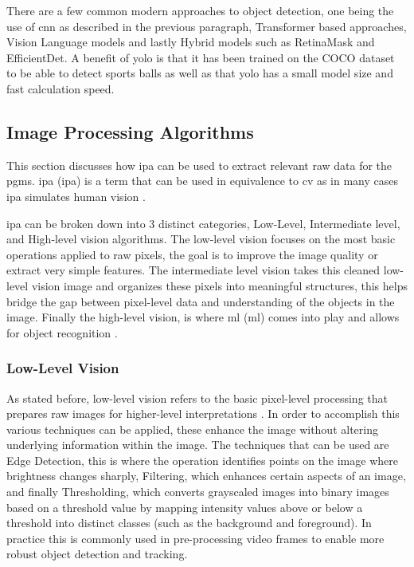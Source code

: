 \documentclass[12pt,a4paper]{article}
\begin{document}
There are a few common modern approaches to object detection, one being the use of \acs{cnn} as described in the previous paragraph, Transformer based approaches, Vision Language models and lastly Hybrid models such as RetinaMask and EfficientDet\parencite{sapkota2025rf}. A benefit of \acs{yolo} is that it has been trained on the COCO dataset to be able to detect sports balls as well as that \acs{yolo} has a small model size and fast calculation speed. 

\subsection{Image Processing Algorithms}
This section discusses how \acs{ipa} can be used to extract relevant raw data for the \acs{pgm}s. \acl{ipa} (\acs{ipa}) is a term that can be used in equivalence to \acs{cv} as in many cases \acs{ipa} simulates human vision \parencite{pitas2000}. 

\acs{ipa} can be broken down into 3 distinct categories, Low-Level, Intermediate level, and High-level vision algorithms. The low-level vision focuses on the most basic operations applied to raw pixels, the goal is to improve the image quality or extract very simple features. The intermediate level vision takes this cleaned low-level vision image and organizes these pixels into meaningful structures, this helps bridge the gap between pixel-level data and understanding of the objects in the image. Finally the high-level vision, is where \acl{ml} (\acs{ml}) comes into play and allows for object recognition \parencite{pitas2000}.

\subsubsection{Low-Level Vision}
As stated before, low-level vision refers to the basic pixel-level processing that prepares raw images for higher-level interpretations \parencite{ji2013_3dvision_intro}. In order to accomplish this various techniques can be applied, these enhance the image without altering underlying information within the image. The techniques that can be used are Edge Detection, this is where the operation identifies points on the image where brightness changes sharply, Filtering, which enhances certain aspects of an image, and finally Thresholding, which converts grayscaled images into binary images based on a threshold value \parencite{metaeye} by mapping intensity values above or below a threshold into distinct classes (such as the background and foreground). In practice this is commonly used in pre-processing video frames to enable more robust object detection and tracking.
\end{document}
